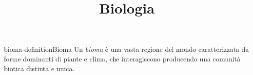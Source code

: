 \documentclass[preview]{standalone}
\begin{document}
\title{Biologia}
\genpage

\begin{snippetdefinition}{bioma-definition}{Bioma}
    Un \textit{bioma} è una vasta regione del mondo caratterizzata da forme dominanti
    di piante e clima, che interagiscono producendo una comunità biotica distinta e unica.
\end{snippetdefinition}



\end{document}
